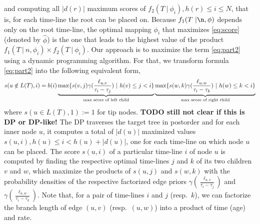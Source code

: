 \documentclass{llncs}
\begin{document}
%
%
and computing all $|d(r)|$ maximum scores of 
$f_2(T\ |\ \phi_i), h(r) \leq i \leq N$, that is, for each time-line the root can be placed on. 
Because $f_1(T\ |\n,\phi)$ depends only on the root time-line, the optimal mapping $\phi_i$ that
maximizes \ref{eq:score} (denoted by $\hat\phi$) is the one that leads to the
highest value of the product $f_1(T\ |\ n,\phi_i)\times f_2(T\ |\ \phi_i)$.%
Our approach is to maximize the term \ref{eq:part2} using a dynamic programming
algorithm. For that, we transform formula \ref{eq:part2} into
the following equivalent form, 
%
%
\begin{equation}\label{eq:DP}
\begin{split}
s(u\notin L(T),i) = %
                    b(i)
                    \underbrace{
                        \max\{ s(v,j)\gamma(\frac{\ell_{u,v}}{\tau_i - \tau_j})\ |\ 
                          h(v) \leq j < i\}
                      }_{\textrm{max score of left child}}
                    \underbrace{
                        \max\{ s(w,k)\gamma(\frac{\ell_{u,w}}{\tau_i - \tau_k\vphantom{\tau_j}})\ |\ 
                          h(w) \leq k < i\}
                      }_{\textrm{max score of right child}}\\
\end{split}
\end{equation}
%
%
where $s(u\in L(T),1) := 1$ for tip nodes.
{\bf TODO still not clear if this is DP or DP-like!}
The DP traverses the target tree in postorder and for each inner node $u$, it
computes a total of $|d(u)|$ maximized values $s(u,i), h(u) \leq i < h(u) + |d(u)|$, one
for each time-line on which node $u$ can be placed.  The score $s(u,i)$ of a
particular time-line $i$ of node $u$ is computed by finding the respective 
optimal time-lines $j$ and $k$ of its two children $v$ and $w$, which maximize the products of
$s(u,j)$ and $s(w,k)$ with the probability densities of the respective factorized edge
priors  $\gamma(\frac{\ell_{u,v}}{\tau_{i}-\tau_{j}})$ and
$\gamma(\frac{\ell_{u,w}}{\tau_{i}-\tau_{k}})$.
                    Note that, for a pair of time-lines $i$
and $j$ (resp.~$k$), we can factorize the branch length of edge $(u,v)$ 
(resp.~$(u,w)$) into a product of time (age) and rate.
\end{document}
